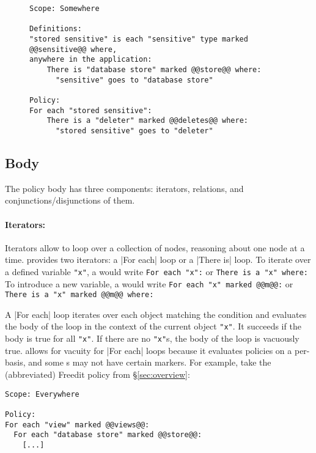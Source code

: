 \begin{figure}[h]
\begin{lstlisting}[language=CNL]
Scope: Somewhere

Definitions:
"stored sensitive" is each "sensitive" type marked @@sensitive@@ where, 
anywhere in the application:
    There is "database store" marked @@store@@ where:
      "sensitive" goes to "database store"

Policy:
For each "stored sensitive":
    There is a "deleter" marked @@deletes@@ where:
      "stored sensitive" goes to "deleter"
\end{lstlisting}
\end{figure}

\subsection{Body}
\label{sec:body}

The policy body has three components: iterators, relations, and conjunctions/disjunctions of them.
%
\paragraph{Iterators: }
Iterators allow \ces{} to loop over a collection of nodes, reasoning about one node at a time.
%
\syslang{} provides two iterators: a |For each| loop or a |There is| loop.
%
To iterate over a defined variable \lstinline[language=CNL]|"x"|, 
a \ce{} would write \lstinline[language=CNL]|For each "x":| or \lstinline[language=CNL]|There is a "x" where:|
%
To introduce a new variable,
a \ce{} would write \lstinline[language=CNL]|For each "x" marked @@m@@:| or \lstinline[language=CNL]|There is a "x" marked @@m@@ where:|

A |For each| loop iterates over each object matching the condition and evaluates the body of the loop 
in the context of the current object \lstinline[language=CNL]|"x"|.
%
It succeeds if the body is true for all \lstinline[language=CNL]|"x"|.
%
If there are no \lstinline[language=CNL]|"x"|s, the body of the loop is vacuously true.
%
\syslang{} allows for vacuity for |For each| loops because it evaluates policies on a per-\controller{} basis,
and some \controller{}s may not have certain markers.
%
For example, take the (abbreviated) Freedit policy from \S\ref{sec:overview}:
\begin{lstlisting}[language=CNL]
Scope: Everywhere

Policy:
For each "view" marked @@views@@:
  For each "database store" marked @@store@@:
    [...]
\end{lstlisting}

